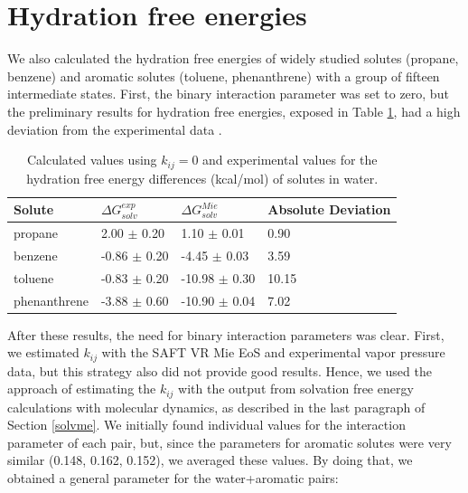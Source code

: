 \section{Hydration free energies}

We also calculated the hydration free energies of widely studied solutes (propane, benzene) and aromatic solutes (toluene, phenanthrene) with a group of fifteen intermediate states. First, the binary interaction parameter was set to zero, but the preliminary results for hydration free energies, exposed in Table \ref{tbl:solv3},  had a high deviation from the experimental data \cite{P29900000291, doi:10.1021/ct050097l}.

\FloatBarrier
\begin{table}[h]
    \centering
    \caption{Calculated values using $k_{ij}=0$ and experimental values for the hydration free energy differences (kcal/mol) of solutes in water.}
    \label{tbl:solv3}
    \begin{tabular}{llll}
    	\hline\hline
    	Solute       & $\Delta G_{solv}^{exp}$ & $\Delta G_{solv}^{Mie}$ & Absolute Deviation \\ \hline
    	propane      & 2.00 $\pm$ 0.20         & 1.10 $\pm$ 0.01         & 0.90               \\
    	benzene      & -0.86 $\pm$ 0.20        & -4.45 $\pm$ 0.03        & 3.59               \\
    	toluene      & -0.83 $\pm$ 0.20        & -10.98 $\pm$ 0.30       & 10.15              \\
    	phenanthrene & -3.88 $\pm$ 0.60        & -10.90 $\pm$ 0.04       & 7.02               \\ \hline\hline
    \end{tabular}
\end{table}
\FloatBarrier

After these results, the need for binary interaction parameters was clear. First, we estimated $k_{ij}$ with the SAFT VR Mie EoS and experimental vapor pressure data, but this strategy also did not provide good results. Hence, we used the approach of estimating the $k_{ij}$ with the output from solvation free energy calculations with molecular dynamics, as described in the last paragraph of Section \ref{solvme}.  We initially found individual values for the interaction parameter of each pair, but, since the parameters for aromatic solutes were very similar (0.148, 0.162, 0.152), we averaged these values. By doing that,  we obtained a general parameter for the water+aromatic pairs:

